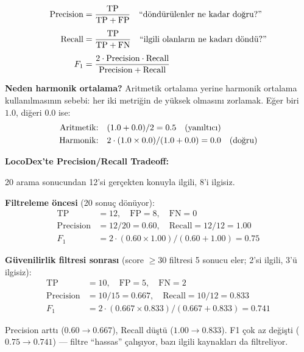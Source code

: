 \begin{formulbox}
\begin{align}
\text{Precision} &= \frac{\text{TP}}{\text{TP} + \text{FP}} \quad \text{``d\"{o}nd\"{u}r\"{u}lenler ne kadar do\u{g}ru?''} \label{eq:search-precision} \\[4pt]
\text{Recall}    &= \frac{\text{TP}}{\text{TP} + \text{FN}} \quad \text{``ilgili olanlar{\i}n ne kadar{\i} d\"{o}nd\"{u}?''} \label{eq:search-recall} \\[4pt]
F_1 &= \frac{2 \cdot \text{Precision} \cdot \text{Recall}}{\text{Precision} + \text{Recall}} \label{eq:search-f1}
\end{align}
\end{formulbox}

\noindent
\textbf{Neden harmonik ortalama?} Aritmetik ortalama yerine harmonik ortalama kullan{\i}lmas{\i}n{\i}n sebebi: her iki metri\u{g}in de y\"{u}ksek olmas{\i}n{\i} zorlamak. E\u{g}er biri $1.0$, di\u{g}eri $0.0$ ise:
\begin{align*}
\text{Aritmetik:} \quad & (1.0 + 0.0)/2 = 0.5 \quad \text{(yan{\i}lt{\i}c{\i})} \\
\text{Harmonik:}  \quad & 2 \cdot (1.0 \times 0.0)/(1.0 + 0.0) = 0.0 \quad \text{(do\u{g}ru)}
\end{align*}

\begin{ornek}
\textbf{LocoDex'te Precision/Recall Tradeoff:}

20 arama sonucundan 12'si ger\c{c}ekten konuyla ilgili, 8'i ilgisiz.

\textbf{Filtreleme \"{o}ncesi} (20 sonu\c{c} d\"{o}n\"{u}yor):
\begin{align*}
\text{TP} &= 12, \quad \text{FP} = 8, \quad \text{FN} = 0 \\
\text{Precision} &= 12/20 = 0.60, \quad \text{Recall} = 12/12 = 1.00 \\
F_1 &= 2 \cdot (0.60 \times 1.00)/(0.60 + 1.00) = 0.75
\end{align*}

\textbf{G\"{u}venilirlik filtresi sonras{\i}} (score $\geq 30$ filtresi 5 sonucu eler; 2'si ilgili, 3'\"{u} ilgisiz):
\begin{align*}
\text{TP} &= 10, \quad \text{FP} = 5, \quad \text{FN} = 2 \\
\text{Precision} &= 10/15 = 0.667, \quad \text{Recall} = 10/12 = 0.833 \\
F_1 &= 2 \cdot (0.667 \times 0.833)/(0.667 + 0.833) = 0.741
\end{align*}

Precision artt{\i} ($0.60 \to 0.667$), Recall d\"{u}\c{s}t\"{u} ($1.00 \to 0.833$). F1 \c{c}ok az de\u{g}i\c{s}ti ($0.75 \to 0.741$) --- filtre ``hassas'' \c{c}al{\i}\c{s}{\i}yor, baz{\i} ilgili kaynaklar{\i} da filtreliyor.
\end{ornek}


